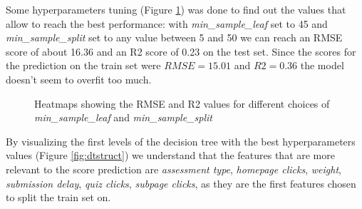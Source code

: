 \documentclass{article}
\begin{document}
Some hyperparameters tuning (Figure \ref{fig:heatmap}) was done to find out the values that allow to reach the best performance: with \textit{min\_sample\_leaf} set to 45 and \textit{min\_sample\_split} set to any value between 5 and 50 we can reach an RMSE score of about 16.36 and an R2 score of 0.23 on the test set. Since the scores for the prediction on the train set were $RMSE = 15.01$ and $R2 = 0.36$ the model doesn't seem to overfit too much. \\

\begin{figure}%
    \centering
    \qquad
    \caption{Heatmaps showing the RMSE and R2 values for different choices of \textit{min\_sample\_leaf} and \textit{min\_sample\_split}}%
    \label{fig:heatmap}%
\end{figure}

By visualizing the first levels of the decision tree with the best hyperparameters values (Figure \ref{fig:dtstruct}) we understand that the features that are more relevant to the score prediction are \textit{assessment type}, \textit{homepage clicks}, \textit{weight}, \textit{submission delay}, \textit{quiz clicks}, \textit{subpage clicks}, as they are the first features chosen to split the train set on. \\
\end{document}
